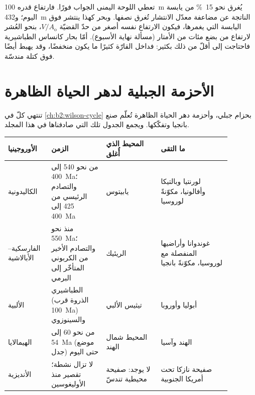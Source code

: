 تعطي اللوحة اليمنى الجواب فورًا. فارتفاع قدره \qty{100}{m} يُغرق نحو
\qty{15}{\percent} من يابسة اليوم؛ و\qty{432}{m} الناتجة عن مضاعفة معدّل الانتشار تُغرق
نصفها. وبحر كهذا ينتشر فوق اليابسة التي يغمرها، فيكون الارتفاع نفسه أصغر من حدّ
القضيّة $V/A_{\text{o}}$، بنحو العُشر لارتفاع من بضع مئات من الأمتار (مسألة نهاية
الأسبوع). أمّا بحار كانساس الطباشيرية فاحتاجت إلى أقلّ من ذلك بكثير: فداخل القارّة كثيرًا ما يكون
منخفضًا، وقد يهبط أيضًا فوق كتلة مندسّة.

\section{الأحزمة الجبلية لدهر الحياة الظاهرة}\label{sec:b2:phanerozoic-earth:orogens}

تنتهي كلّ  في \cref{ch:b2:wilson-cycle} بحزام جبلي، وأحزمة دهر الحياة الظاهرة
تُعلّم صنع بانجيا وتفكّكها. ويجمع الجدول تلك التي صادفناها في هذا المجلد.

\begin{center}
\small
\begin{tabular}{>{\raggedright\arraybackslash}p{0.15\linewidth}>{\raggedright\arraybackslash}p{0.22\linewidth}>{\raggedright\arraybackslash}p{0.22\linewidth}>{\raggedright\arraybackslash}p{0.29\linewidth}}
\hline
الأوروجينيا & الزمن & المحيط الذي أُغلق & ما التقى \\
\hline
الكاليدونية & من نحو 540 إلى \qty{400}{Ma}؛ والتصادم الرئيسي من 425 إلى \qty{400}{Ma} & يابيتوس & لورنتيا وبالتيكا
وأفالونيا، مكوّنةً لوروسيا \\
الفارسكية--الأبالاشية & منذ نحو \qty{550}{Ma}؛ والتصادم الأخير من الكربوني المتأخّر إلى البرمي & الريئيك &
غوندوانا وأراضيها المنفصلة مع لوروسيا، مكوّنةً بانجيا \\
الألبية & الطباشيري (الذروة قرب \qty{100}{Ma}) والسينوزوي & تيثيس الألبي & أبوليا وأوروبا \\
الهيمالايا & من نحو 60 إلى \qty{54}{Ma} (موضع جدل) حتى اليوم & المحيط شمال الهند & الهند وآسيا \\
الأنديزية & لا تزال نشطة؛ تقصير منذ الأوليغوسين & لا يوجد: صفيحة محيطية تندسّ & صفيحة
نازكا تحت أمريكا الجنوبية \\
\hline
\end{tabular}
\end{center}

